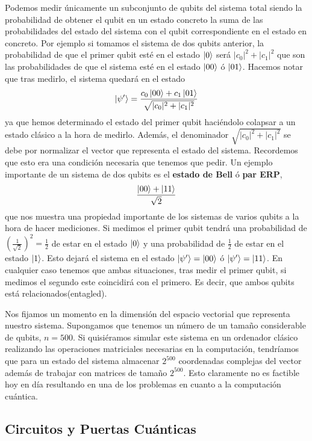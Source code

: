 \documentclass[a4paper]{article}
\numberwithin{equation}{section}
\begin{document}
Podemos medir únicamente un subconjunto de qubits del sistema total siendo la probabilidad de obtener el qubit en un estado concreto la suma de las probabilidades del estado del sistema con el qubit correspondiente en el estado en concreto. Por ejemplo si tomamos el sistema de dos qubits anterior, la probabilidad de que el primer qubit esté en el estado $\ket{0}$ será $|c_0|^2 + |c_1|^2$ que son las probabilidades de que el sistema esté en el estado $\ket{00}$ ó $\ket{01}$. Hacemos notar que tras medirlo, el sistema quedará en el estado
\begin{equation}
\ket{\psi'} = \frac{c_0\ket{00} + c_1\ket{01}}{\sqrt{|c_0|^2 + |c_1|^2}}
\end{equation}
ya que hemos determinado el estado del primer qubit haciéndolo colapsar a un estado clásico a la hora de medirlo. Además, el denominador $\sqrt{|c_0|^2 + |c_1|^2}$ se debe por normalizar el vector que representa el estado del sistema. Recordemos que esto era una condición necesaria que tenemos que pedir.
Un ejemplo importante de un sistema de dos qubits es el \textbf{estado de Bell} ó \textbf{par ERP},
\begin{equation}
\frac{\ket{00} + \ket{11}}{\sqrt{2}}
\end{equation}
que nos muestra una propiedad importante de los sistemas de varios qubits a la hora de hacer mediciones. Si medimos el primer qubit tendrá una probabilidad de $(\frac{1}{\sqrt{2}})^2 = \frac{1}{2}$ de estar en el estado $\ket{0}$ y una probabilidad de $\frac{1}{2}$ de estar en el estado $\ket{1}$. Esto dejará el sistema en el estado $\ket{\psi'} = \ket{00}$ ó $\ket{\psi'} = \ket{11}$. En cualquier caso tenemos que ambas situaciones, tras medir el primer qubit, si medimos el segundo este coincidirá con el primero. Es decir, que ambos qubits está relacionados(entagled).

Nos fijamos un momento en la dimensión del espacio vectorial que representa nuestro sistema. Supongamos que tenemos un número de un tamaño considerable de qubits, $n=500$. Si quisiéramos simular este sistema en un ordenador clásico realizando las operaciones matriciales necesarias en la computación, tendríamos que para un estado del sistema almacenar $2^{500}$ coordenadas complejas del vector además de trabajar con matrices de tamaño $2^{500}$. Esto claramente no es factible hoy en día resultando en una de los problemas en cuanto a la computación cuántica.

\subsection{Circuitos y Puertas Cuánticas}
\end{document}

